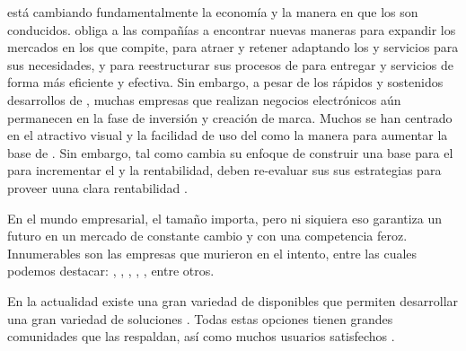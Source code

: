 			\ecommerceCOM está cambiando fundamentalmente la economía y la manera en que los \businessCOM son conducidos. \ecommerceCOM obliga a las compañías a encontrar nuevas maneras para expandir los mercados en los que compite, para atraer y retener \customersCOM adaptando los \itemsCOM y servicios para sus necesidades, y para reestructurar sus procesos de \businessCOM para entregar \itemsCOM y servicios de forma más eficiente y efectiva. Sin embargo, a pesar de los rápidos y sostenidos desarrollos de \ecommerceCOM, muchas empresas que realizan negocios electrónicos aún permanecen en la fase de inversión y creación de marca. Muchos \ebusinessCOM se han centrado en el atractivo visual y la facilidad de uso del \websiteINT como la manera para aumentar la base de \customersCOM. Sin embargo, tal como \ebusinessCOM cambia su enfoque de construir una base para el \customerCOM para incrementar el \revenueQA y la rentabilidad, deben re-evaluar sus sus estrategias para proveer uuna clara rentabilidad \cite{shin2001strategies}.

			En el mundo empresarial, el tamaño importa, pero ni siquiera eso garantiza un futuro en un mercado de constante cambio y con una competencia feroz. Innumerables son las empresas que murieron en el intento, entre las cuales podemos destacar: \sega, \kodak, \daewoo, \nokia, \blockbuster, entre otros.

			En la actualidad existe una gran variedad de \frameworksPC \openSourcePC disponibles que permiten desarrollar una gran variedad de soluciones \ecommerceCOM. Todas estas opciones tienen grandes comunidades que las respaldan, así como muchos usuarios satisfechos \citeAllFrameworks. 

